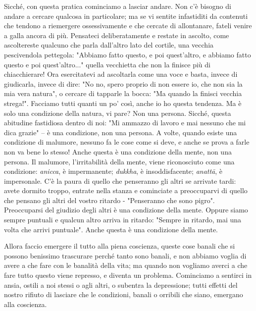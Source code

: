 Sicché, con questa pratica cominciamo a lasciar andare. Non c'è bisogno
di andare a cercare qualcosa in particolare; ma se vi sentite
infastiditi da contenuti che tendono a riemergere ossessivamente e che
cercate di allontanare, fateli venire a galla ancora di più. Pensateci
deliberatamente e restate in ascolto, come ascoltereste qualcuno che
parla dall'altro lato del cortile, una vecchia pescivendola pettegola:
"Abbiamo fatto questo, e poi quest'altro, e abbiamo fatto questo e poi
quest'altro..." quella vecchietta che non la finisce più di
chiacchierare! Ora esercitatevi ad ascoltarla come una voce e basta,
invece di giudicarla, invece di dire: "No no, spero proprio di non
essere io, che non sia la mia vera natura", o cercare di tapparle la
bocca: "Ma quando la finisci vecchia strega!". Facciamo tutti quanti un
po' così, anche io ho questa tendenza. Ma è solo una condizione della
natura, vi pare? Non una persona. Sicché, questa abitudine fastidiosa
dentro di noi: "Mi ammazzo di lavoro e mai nessuno che mi dica grazie" –
è una condizione, non una persona. A volte, quando esiste una condizione
di malumore, nessuno fa le cose come si deve, e anche se prova a farle
non va bene lo stesso! Anche questa è una condizione della mente, non
una persona. Il malumore, l'irritabilità della mente, viene riconosciuto
come una condizione: \textit{anicca}, è impermanente; \textit{dukkha}, è insoddisfacente;
\textit{anattā}, è impersonale. C'è la paura di quello che penseranno gli altri
se arrivate tardi: avete dormito troppo, entrate nella stanza e
cominciate a preoccuparvi di quello che pensano gli altri del vostro
ritardo - "Penseranno che sono pigro". Preoccuparsi del giudizio degli
altri è una condizione della mente. Oppure siamo sempre puntuali e
qualcun altro arriva in ritardo: "Sempre in ritardo, mai una volta che
arrivi puntuale". Anche questa è una condizione della mente.

Allora faccio emergere il tutto alla piena coscienza, queste cose banali
che si possono benissimo trascurare perché tanto sono banali, e non
abbiamo voglia di avere a che fare con le banalità della vita; ma quando
non vogliamo averci a che fare tutto questo viene represso, e diventa un
problema. Cominciamo a sentirci in ansia, ostili a noi stessi o agli
altri, o subentra la depressione; tutti effetti del nostro rifiuto di
lasciare che le condizioni, banali o orribili che siano, emergano alla
coscienza.

